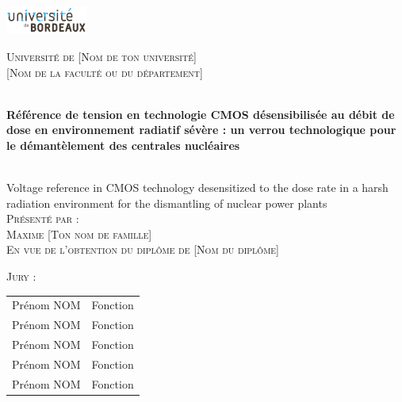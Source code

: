 \begin{titlepage}
    \begin{center}
        \includegraphics[width=0.2\textwidth]{figures/universite_de_bordeaux.pdf} \\
        \vspace{1cm}

        \textsc{\Large Université de [Nom de ton université]}\\[0.5cm]

        \textsc{\Large [Nom de la faculté ou du département]}\\[1.5cm]
\begin{spacing}{2}
     \HRule \\[0.4cm]
     { \huge \bfseries Référence de tension en technologie CMOS désensibilisée au débit de dose en environnement radiatif sévère : un verrou technologique pour le démantèlement des centrales nucléaires}\\[0.4cm]
     \HRule \\[1.5cm]
\end{spacing}
       

        { \large Voltage reference in CMOS technology desensitized to the dose rate in a harsh radiation environment for the dismantling of nuclear power plants}\\[1.5cm]

        \textsc{\Large Présenté par :}\\[0.4cm]
        \textsc{\large Maxime [Ton nom de famille]}\\[2cm]

        \textsc{\Large En vue de l'obtention du diplôme de [Nom du diplôme]}\\[1cm]

        \begin{flushleft}
            \textsc{Jury :}\\[0.4cm]
            \begin{tabular}{ll}
                Prénom NOM & Fonction \\
                Prénom NOM & Fonction \\
                Prénom NOM & Fonction \\
                Prénom NOM & Fonction \\
                Prénom NOM & Fonction \\
            \end{tabular}
        \end{flushleft}
 
    \end{center}
\end{titlepage}
